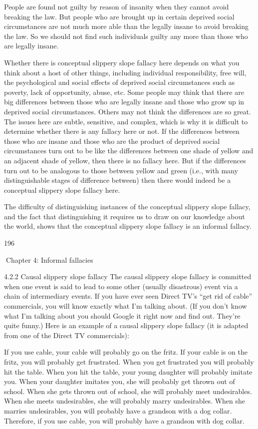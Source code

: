 People are found not guilty by reason of insanity when they cannot avoid
breaking the law. But people who are brought up in certain deprived
social circumstances are not much more able than the legally insane to
avoid breaking the law. So we should not find such individuals guilty any
more than those who are legally insane.

Whether there is conceptual slippery slope fallacy here depends on what you
think about a host of other things, including individual responsibility, free will,
the psychological and social effects of deprived social circumstances such as
poverty, lack of opportunity, abuse, etc. Some people may think that there are
big differences between those who are legally insane and those who grow up in
deprived social circumstances. Others may not think the differences are so
great. The issues here are subtle, sensitive, and complex, which is why it is
difficult to determine whether there is any fallacy here or not. If the differences
between those who are insane and those who are the product of deprived social
circumstances turn out to be like the differences between one shade of yellow
and an adjacent shade of yellow, then there is no fallacy here. But if the
differences turn out to be analogous to those between yellow and green (i.e.,
with many distinguishable stages of difference between) then there would
indeed be a conceptual slippery slope fallacy here.

The difficulty of
distinguishing instances of the conceptual slippery slope fallacy, and the fact
that distinguishing it requires us to draw on our knowledge about the world,
shows that the conceptual slippery slope fallacy is an informal fallacy.

196

Chapter 4: Informal fallacies

4.2.2 Causal slippery slope fallacy
The causal slippery slope fallacy is committed when one event is said to lead to
some other (usually disastrous) event via a chain of intermediary events. If you
have ever seen Direct TV’s “get rid of cable” commercials, you will know exactly
what I’m talking about. (If you don’t know what I’m talking about you should
Google it right now and find out. They’re quite funny.) Here is an example of a
causal slippery slope fallacy (it is adapted from one of the Direct TV
commercials):

If you use cable, your cable will probably go on the fritz. If your cable is
on the fritz, you will probably get frustrated. When you get frustrated you
will probably hit the table. When you hit the table, your young daughter
will probably imitate you. When your daughter imitates you, she will
probably get thrown out of school. When she gets thrown out of school,
she will probably meet undesirables. When she meets undesirables, she
will probably marry undesirables. When she marries undesirables, you
will probably have a grandson with a dog collar. Therefore, if you use
cable, you will probably have a grandson with dog collar.

